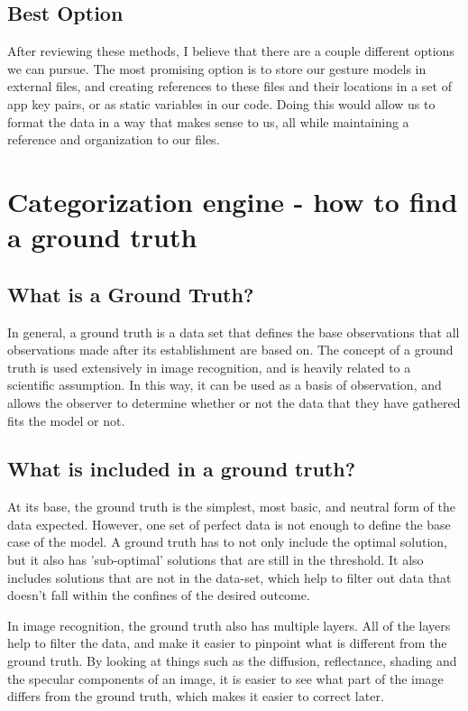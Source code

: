 \documentclass[onecolumn, draftclsnofoot,10pt, journal, letterpaper]{IEEEtran}
\begin{document}
    \subsection{Best Option}
    After reviewing these methods, I believe that there are a couple different options we can pursue. The most promising option is to store our gesture models in external files, and creating references to these files and their locations in a set of app key pairs, or as static variables in our code. Doing this would allow us to format the data in a way that makes sense to us, all while maintaining a reference and organization to our files.

\section{Categorization engine - how to find a ground truth}
    \subsection{What is a Ground Truth?}
    In general, a ground truth is a data set that defines the base observations that all observations made after its establishment are based on. The concept of a ground truth is used extensively in image recognition, and is heavily related to a scientific assumption. In this way, it can be used as a basis of observation, and allows the observer to determine whether or not the data that they have gathered fits the model or not. \cite{danilo_pena_ground_2018}
    
    \subsection{What is included in a ground truth?}
    At its base, the ground truth is the simplest, most basic, and neutral form of the data expected. However, one set of perfect data is not enough to define the base case of the model. A ground truth has to not only include the optimal solution, but it also has 'sub-optimal' solutions that are still in the threshold. \cite{krig_computer_2014} It also includes solutions that are not in the data-set, which help to filter out data that doesn't fall within the confines of the desired outcome.\par
    In image recognition, the ground truth also has multiple layers. All of the layers help to filter the data, and make it easier to pinpoint what is different from the ground truth. By looking at things such as the diffusion, reflectance, shading and the specular components of an image, it is easier to see what part of the image differs from the ground truth, which makes it easier to correct later. \cite{roger_grose_ground_2009}
    
\end{document}
